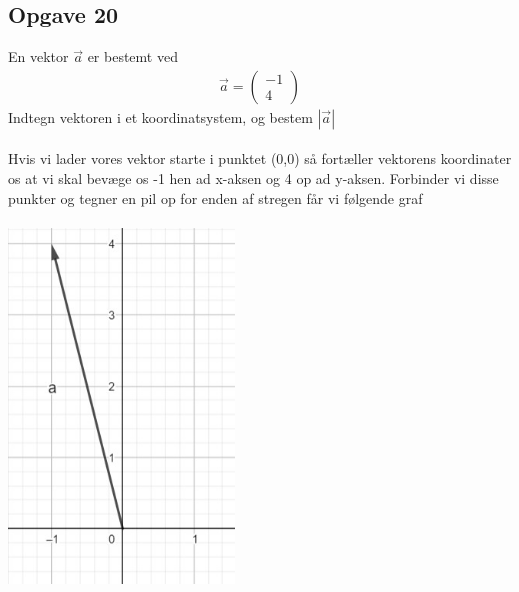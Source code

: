 \subsection{Opgave 20}

En vektor $\Vec{a}$ er bestemt ved
\begin{align*}
    \Vec{a} = \begin{pmatrix}-1 \\ 4\end{pmatrix}
\end{align*}
Indtegn vektoren i et koordinatsystem, og bestem $|\Vec{a}|$\\\\

\ans
Hvis vi lader vores vektor starte i punktet (0,0) så fortæller vektorens koordinater os at vi skal bevæge os -1 hen ad x-aksen og 4 op ad y-aksen. Forbinder vi disse punkter og tegner en pil op for enden af stregen får vi følgende graf\\\\
\includegraphics[width = 6cm]{Opgave_11-20/Opgave_20/20.jpg}